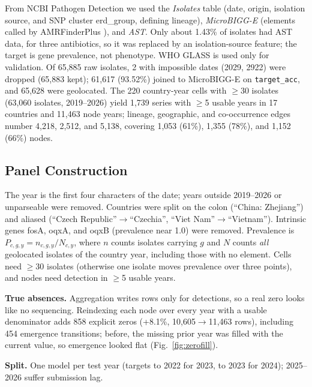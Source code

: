 \documentclass[journal]{IEEEtran}
\begin{document}
From NCBI Pathogen Detection we used the \textit{Isolates} table (date, origin, isolation source, and SNP cluster erd\_group, defining lineage), \textit{MicroBIGG-E} (elements called by AMRFinderPlus \cite{ref7}), and \textit{AST}. Only about 1.43\% of isolates had AST data, for three antibiotics, so it was replaced by an isolation-source feature; the target is gene prevalence, not phenotype. WHO GLASS \cite{ref4} is used only for validation. Of 65,885 raw isolates, 2 with impossible dates (2029, 2922) were dropped (65,883 kept); 61,617 (93.52\%) joined to MicroBIGG-E on \texttt{target\_acc}, and 65,628 were geolocated. The 220 country-year cells with $\ge$30 isolates (63,060 isolates, 2019--2026) yield 1,739 series with $\ge$5 usable years in 17 countries and 11,463 node years; lineage, geographic, and co-occurrence edges number 4,218, 2,512, and 5,138, covering 1,053 (61\%), 1,355 (78\%), and 1,152 (66\%) nodes.


\subsection{Panel Construction}
The year is the first four characters of the date; years outside 2019--2026 or unparseable were removed. Countries were split on the colon (``China: Zhejiang'') and aliased (``Czech Republic''$\to$``Czechia'', ``Viet Nam''$\to$``Vietnam''). Intrinsic genes fosA, oqxA, and oqxB (prevalence near 1.0) were removed. Prevalence is $P_{c,g,y} = n_{c,g,y}/N_{c,y}$, where $n$ counts isolates carrying $g$ and $N$ counts \textit{all} geolocated isolates of the country year, including those with no element. Cells need $\ge$30 isolates (otherwise one isolate moves prevalence over three points), and nodes need detection in $\ge$5 usable years.

\textbf{True absences.} Aggregation writes rows only for detections, so a real zero looks like no sequencing. Reindexing each node over every year with a usable denominator adds 858 explicit zeros (+8.1\%, 10,605$\to$11,463 rows), including 454 emergence transitions; before, the missing prior year was filled with the current value, so emergence looked flat (Fig.~\ref{fig:zerofill}).

\textbf{Split.} One model per test year (targets to 2022 for 2023, to 2023 for 2024); 2025--2026 suffer submission lag.
\end{document}
